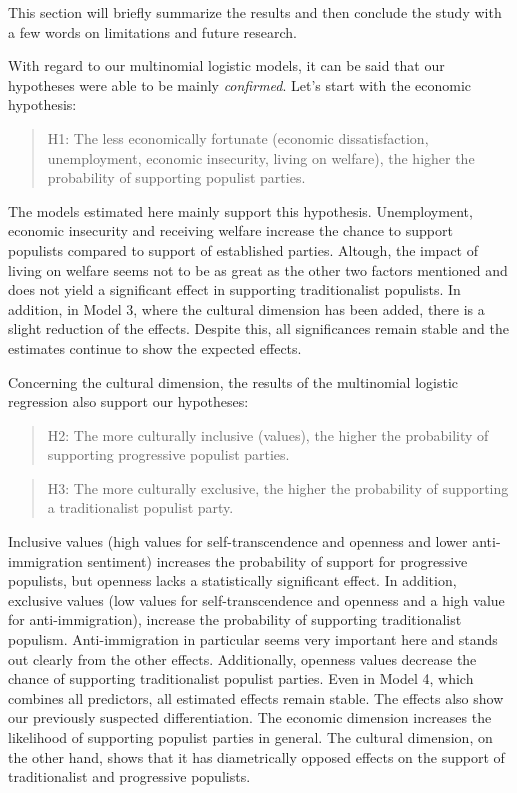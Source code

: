 \documentclass[]{article}
\title{}
\author{}
\date{}
\begin{document}
This section will briefly summarize the results and then conclude the
study with a few words on limitations and future research.

With regard to our multinomial logistic models, it can be said that our
hypotheses were able to be mainly \emph{confirmed}. Let's start with the
economic hypothesis:

\begin{quote}
H1: The less economically fortunate (economic dissatisfaction,
unemployment, economic insecurity, living on welfare), the higher the
probability of supporting populist parties.
\end{quote}

The models estimated here mainly support this hypothesis. Unemployment,
economic insecurity and receiving welfare increase the chance to support
populists compared to support of established parties. Altough, the
impact of living on welfare seems not to be as great as the other two
factors mentioned and does not yield a significant effect in supporting
traditionalist populists. In addition, in Model 3, where the cultural
dimension has been added, there is a slight reduction of the effects.
Despite this, all significances remain stable and the estimates continue
to show the expected effects.

Concerning the cultural dimension, the results of the multinomial
logistic regression also support our hypotheses:

\begin{quote}
H2: The more culturally inclusive (values), the higher the probability
of supporting progressive populist parties.
\end{quote}

\begin{quote}
H3: The more culturally exclusive, the higher the probability of
supporting a traditionalist populist party.
\end{quote}

Inclusive values (high values for self-transcendence and openness and
lower anti-immigration sentiment) increases the probability of support
for progressive populists, but openness lacks a statistically
significant effect. In addition, exclusive values (low values for
self-transcendence and openness and a high value for anti-immigration),
increase the probability of supporting traditionalist populism.
Anti-immigration in particular seems very important here and stands out
clearly from the other effects. Additionally, openness values decrease
the chance of supporting traditionalist populist parties. Even in Model
4, which combines all predictors, all estimated effects remain stable.
The effects also show our previously suspected differentiation. The
economic dimension increases the likelihood of supporting populist
parties in general. The cultural dimension, on the other hand, shows
that it has diametrically opposed effects on the support of
traditionalist and progressive populists.
\end{document}
